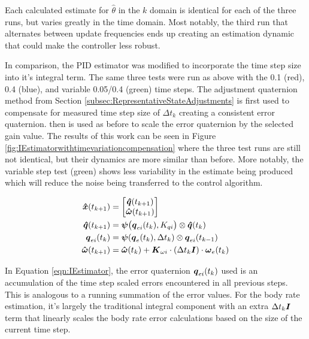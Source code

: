 Each calculated estimate for $\hat{\theta}$ in the $k$ domain is identical for each of the three runs, but varies greatly in the time domain.  Most notably, the third run that alternates between update frequencies ends up creating an estimation dynamic that could make the controller less robust.

In comparison, the PID estimator was modified to incorporate the time step size into it's integral term.  The same three tests were run as above with the 0.1 (red), 0.4 (blue), and variable 0.05/0.4 (green) time steps.  The adjustment quaternion method from Section \ref{subsec:RepresentativeStateAdjustments} is first used to compensate for measured time step size of $\Delta t_{k}$ creating a consistent error quaternion. then is used as before to scale the error quaternion by the selected gain value.  The results of this work can be seen in Figure \ref{fig:IEstimatorwithtimevariationcompensation} where the three test runs are still not identical, but their dynamics are more similar than before.  More notably, the variable step test (green) shows less variability in the estimate being produced which will reduce the noise being transferred to the control algorithm.

\begin{subequations}
  \begin{align}
    \boldsymbol{\hat{x}}(t_{k+1}) &= \begin{bmatrix} \boldsymbol{\hat{q}}(t_{k+1}) \\ \boldsymbol{\hat{\omega}}(t_{k+1}) \end{bmatrix} \\
    \boldsymbol{\hat{q}}(t_{k+1}) &= \boldsymbol{\psi}\big(\boldsymbol{q}_{ei}(t_k), K_{qi}\big) \otimes \boldsymbol{\hat{q}}(t_{k}) \\
    \boldsymbol{q}_{ei}(t_k) &= \boldsymbol{\psi}(\boldsymbol{q}_e(t_{k}), \Delta t_{k}) \otimes \boldsymbol{q}_{ei}(t_{k-1})\\
    \boldsymbol{\hat{\omega}}(t_{k+1}) &= \boldsymbol{\hat{\omega}}(t_{k}) + \boldsymbol{K}_{\omega i} \cdot (\Delta t_k \boldsymbol{I})\cdot \boldsymbol{\omega}_e(t_{k})
  \end{align}
  \label{eqn:IEstimator}
\end{subequations}

In Equation \ref{eqn:IEstimator}, the error quaternion $\boldsymbol{q}_{ei}(t_k)$ used is an accumulation of the time step scaled errors encountered in all previous steps.  This is analogous to a running summation of the error values.  For the body rate estimation, it's largely the traditional integral component with an extra $\Delta t_k \boldsymbol{I}$ term that linearly scales the body rate error calculations based on the size of the current time step.


